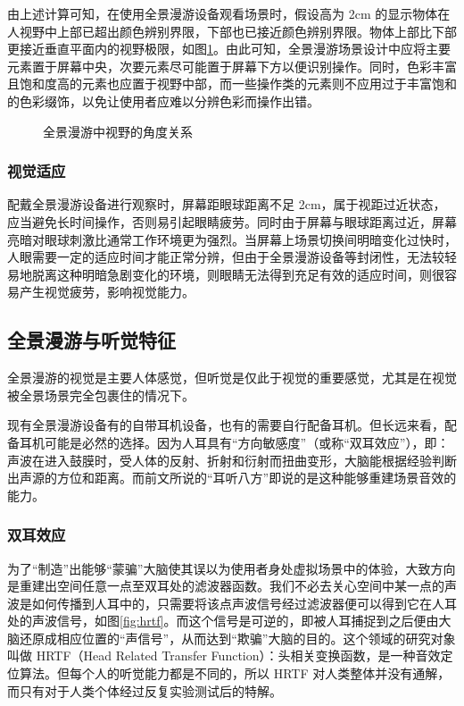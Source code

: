 由上述计算可知，在使用全景漫游设备观看场景时，假设高为 2cm 的显示物体在人视野中上部已超出颜色辨别界限，下部也已接近颜色辨别界限。物体上部比下部更接近垂直平面内的视野极限，如图\ref{fig:angle}。由此可知，全景漫游场景设计中应将主要元素置于屏幕中央，次要元素尽可能置于屏幕下方以便识别操作。同时，色彩丰富且饱和度高的元素也应置于视野中部，而一些操作类的元素则不应用过于丰富饱和的色彩缀饰，以免让使用者应难以分辨色彩而操作出错。

\begin{figure}[htp]
\centering
{}
\caption{全景漫游中视野的角度关系}
\label{fig:angle}
\end{figure}

\subsubsection{视觉适应}

配戴全景漫游设备进行观察时，屏幕距眼球距离不足 2cm，属于视距过近状态，应当避免长时间操作，否则易引起眼睛疲劳。同时由于屏幕与眼球距离过近，屏幕亮暗对眼球刺激比通常工作环境更为强烈。当屏幕上场景切换间明暗变化过快时，人眼需要一定的适应时间才能正常分辨，但由于全景漫游设备等封闭性，无法较轻易地脱离这种明暗急剧变化的环境，则眼睛无法得到充足有效的适应时间，则很容易产生视觉疲劳，影响视觉能力。

\subsection{全景漫游与听觉特征}

全景漫游的视觉是主要人体感觉，但听觉是仅此于视觉的重要感觉，尤其是在视觉被全景场景完全包裹住的情况下。

现有全景漫游设备有的自带耳机设备，也有的需要自行配备耳机。但长远来看，配备耳机可能是必然的选择。因为人耳具有“方向敏感度”（或称“双耳效应”），即：声波在进入鼓膜时，受人体的反射、折射和衍射而扭曲变形，大脑能根据经验判断出声源的方位和距离。而前文所说的“耳听八方”即说的是这种能够重建场景音效的能力。

\subsubsection{双耳效应}
为了“制造”出能够“蒙骗”大脑使其误以为使用者身处虚拟场景中的体验，大致方向是重建出空间任意一点至双耳处的滤波器函数。我们不必去关心空间中某一点的声波是如何传播到人耳中的，只需要将该点声波信号经过滤波器便可以得到它在人耳处的声波信号，如图\ref{fig:hrtf}。而这个信号是可逆的，即被人耳捕捉到之后便由大脑还原成相应位置的“声信号”，从而达到“欺骗”大脑的目的。这个领域的研究对象叫做 HRTF（Head Related Transfer Function）：头相关变换函数，是一种音效定位算法。但每个人的听觉能力都是不同的，所以 HRTF 对人类整体并没有通解，而只有对于人类个体经过反复实验测试后的特解。

